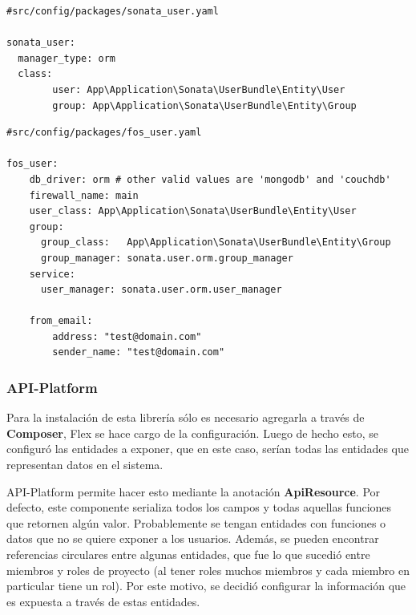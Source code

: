 \begin{lstlisting}[caption={Archivo de configuración de Sonata-User.\\Fuente: \sonatainstallation}]
#src/config/packages/sonata_user.yaml

sonata_user:
  manager_type: orm
  class:
        user: App\Application\Sonata\UserBundle\Entity\User
        group: App\Application\Sonata\UserBundle\Entity\Group

\end{lstlisting}

\newpage
\begin{lstlisting}[caption=Archivo de configuración de FOSUser.\\Fuente: \sonatainstallation]
#src/config/packages/fos_user.yaml

fos_user:
    db_driver: orm # other valid values are 'mongodb' and 'couchdb'
    firewall_name: main
    user_class: App\Application\Sonata\UserBundle\Entity\User
    group:
      group_class:   App\Application\Sonata\UserBundle\Entity\Group
      group_manager: sonata.user.orm.group_manager
    service:
      user_manager: sonata.user.orm.user_manager

    from_email:
        address: "test@domain.com"
        sender_name: "test@domain.com"

\end{lstlisting}

\subsubsection{API-Platform}%
\label{ssub:api_platform}

Para la instalación de esta librería sólo es necesario agregarla a través de \textbf{Composer}, Flex se hace cargo de la configuración\@. Luego de hecho esto,
se configuró las entidades a exponer, que en este caso, serían todas las entidades que representan datos en el sistema.


API-Platform permite hacer esto mediante la anotación \textbf{ApiResource}. Por defecto, este componente serializa todos los campos y todas aquellas funciones
que retornen algún valor\@. Probablemente se tengan entidades con funciones o datos que no se quiere exponer a los usuarios. Además, se pueden encontrar
referencias circulares entre algunas entidades, que fue lo que sucedió entre miembros y roles de proyecto (al tener roles muchos miembros y cada miembro
en particular tiene un rol). Por este motivo, se decidió configurar la información que es expuesta a través de estas entidades.

